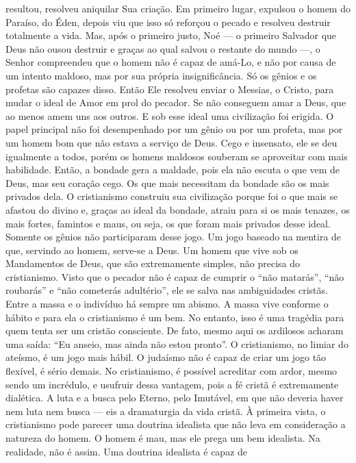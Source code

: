 resultou, resolveu aniquilar Sua criação. Em primeiro lugar, expulsou o
homem do Paraíso, do Éden, depois viu que isso só reforçou o pecado e
resolveu destruir totalmente a vida. Mas, após o primeiro justo, Noé ---
o primeiro Salvador que Deus não ousou destruir e graças ao qual salvou
o restante do mundo ---, o Senhor compreendeu que o homem não é capaz de
amá-Lo, e não por causa de um intento maldoso, mas por sua própria
insignificância. Só os gênios e os profetas são capazes disso. Então Ele
resolveu enviar o Messias, o Cristo, para mudar o ideal de Amor em prol
do pecador. Se não conseguem amar a Deus, que ao menos amem uns aos
outros. E sob esse ideal uma civilização foi erigida. O papel principal
não foi desempenhado por um gênio ou por um profeta, mas por um homem
bom que não estava a serviço de Deus. Cego e insensato, ele se deu
igualmente a todos, porém os homens maldosos souberam se aproveitar com
mais habilidade. Então, a bondade gera a maldade, pois ela não escuta o
que vem de Deus, mas seu coração cego. Os que mais necessitam da bondade
são os mais privados dela. O cristianismo construiu sua civilização
porque foi o que mais se afastou do divino e, graças ao ideal da
bondade, atraiu para si os mais tenazes, os mais fortes, famintos e
maus, ou seja, os que foram mais privados desse ideal. Somente os gênios
não participaram desse jogo. Um jogo baseado na mentira de que, servindo
ao homem, serve-se a Deus. Um homem que vive sob os Mandamentos de Deus,
que são extremamente simples, não precisa do cristianismo. Visto que o
pecador não é capaz de cumprir o ``não matarás'', ``não roubarás'' e
``não cometerás adultério'', ele se salva nas ambiguidades cristãs.
Entre a massa e o indivíduo há sempre um abismo. A massa vive conforme o
hábito e para ela o cristianismo é um bem. No entanto, isso é uma
tragédia para quem tenta ser um cristão consciente. De fato, mesmo aqui
os ardilosos acharam uma saída: ``Eu anseio, mas ainda não estou
pronto''. O cristianismo, no limiar do ateísmo, é um jogo mais hábil. O
judaísmo não é capaz de criar um jogo tão flexível, é sério demais. No
cristianismo, é possível acreditar com ardor, mesmo sendo um incrédulo,
e usufruir dessa vantagem, pois a fé cristã é extremamente dialética. A
luta e a busca pelo Eterno, pelo Imutável, em que não deveria haver nem
luta nem busca --- eis a dramaturgia da vida cristã. À primeira vista, o
cristianismo pode parecer uma doutrina idealista que não leva em
consideração a natureza do homem. O homem é mau, mas ele prega um bem
idealista. Na realidade, não é assim. Uma doutrina idealista é capaz de
